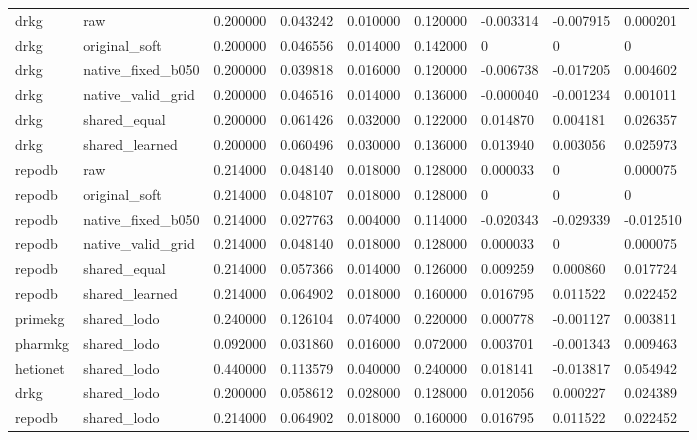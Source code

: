\begin{tabular}{lllllllll}
drkg & raw & 0.200000 & 0.043242 & 0.010000 & 0.120000 & -0.003314 & -0.007915 & 0.000201 \\
drkg & original\_soft & 0.200000 & 0.046556 & 0.014000 & 0.142000 & 0 & 0 & 0 \\
drkg & native\_fixed\_b050 & 0.200000 & 0.039818 & 0.016000 & 0.120000 & -0.006738 & -0.017205 & 0.004602 \\
drkg & native\_valid\_grid & 0.200000 & 0.046516 & 0.014000 & 0.136000 & -0.000040 & -0.001234 & 0.001011 \\
drkg & shared\_equal & 0.200000 & 0.061426 & 0.032000 & 0.122000 & 0.014870 & 0.004181 & 0.026357 \\
drkg & shared\_learned & 0.200000 & 0.060496 & 0.030000 & 0.136000 & 0.013940 & 0.003056 & 0.025973 \\
repodb & raw & 0.214000 & 0.048140 & 0.018000 & 0.128000 & 0.000033 & 0 & 0.000075 \\
repodb & original\_soft & 0.214000 & 0.048107 & 0.018000 & 0.128000 & 0 & 0 & 0 \\
repodb & native\_fixed\_b050 & 0.214000 & 0.027763 & 0.004000 & 0.114000 & -0.020343 & -0.029339 & -0.012510 \\
repodb & native\_valid\_grid & 0.214000 & 0.048140 & 0.018000 & 0.128000 & 0.000033 & 0 & 0.000075 \\
repodb & shared\_equal & 0.214000 & 0.057366 & 0.014000 & 0.126000 & 0.009259 & 0.000860 & 0.017724 \\
repodb & shared\_learned & 0.214000 & 0.064902 & 0.018000 & 0.160000 & 0.016795 & 0.011522 & 0.022452 \\
primekg & shared\_lodo & 0.240000 & 0.126104 & 0.074000 & 0.220000 & 0.000778 & -0.001127 & 0.003811 \\
pharmkg & shared\_lodo & 0.092000 & 0.031860 & 0.016000 & 0.072000 & 0.003701 & -0.001343 & 0.009463 \\
hetionet & shared\_lodo & 0.440000 & 0.113579 & 0.040000 & 0.240000 & 0.018141 & -0.013817 & 0.054942 \\
drkg & shared\_lodo & 0.200000 & 0.058612 & 0.028000 & 0.128000 & 0.012056 & 0.000227 & 0.024389 \\
repodb & shared\_lodo & 0.214000 & 0.064902 & 0.018000 & 0.160000 & 0.016795 & 0.011522 & 0.022452 \\
\hline
\end{tabular}